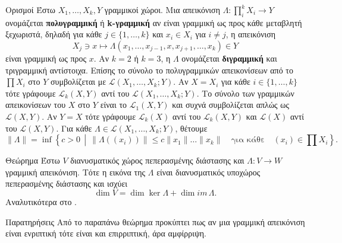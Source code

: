 \begin{nameddefn}{Ορισμοί}
    Έστω $X_1,\ldots,X_k,Y$ γραμμικοί χώροι. Μια απεικόνιση $ \Lambda: 
    \prod_i^k X_i \rightarrow Y$ ονομάζεται \textbf{πολυγραμμική} ή \textbf
    {k-γραμμική} αν είναι γραμμική ως προς κάθε μεταβλητή ξεχωριστά, δηλαδή για 
    κάθε $j \in \{1, \ldots, k\}$ και $x_i \in X_i $ για $i \neq j$, η 
    απεικόνιση
    \begin{equation*}
        X_j \ni x \mapsto \Lambda\left(x_1, \ldots , x_{j-1}, x, x_{j+1}, 
        \dots, x_k\right) \in Y
    \end{equation*}
    είναι γραμμική ως προς $x$. Αν $k = 2$ ή $k = 3$, η $\Lambda$ ονομάζεται 
    \textbf{διγραμμική} και τριγραμμική αντίστοιχα. Επίσης το σύνολο το 
    πολυγραμμικών απεικονίσεων από το $\prod X_i$ στο $Y$ συμβολίζεται με 
    $\mathcal{L}\left(X_1,\ldots,X_k; Y\right)$. Αν $X = X_i$ για κάθε $i \in 
    \{1,\ldots,k\}$ τότε γράφουμε $\mathcal{L}_k(X, Y)$ αντί του $\mathcal{L}
    \left(X_1,\ldots,X_k;Y\right)$. Το σύνολο των γραμμικών απεικονίσεων του $X$
    στο $Y$ είναι το $\mathcal{L}_1(X, Y)$ και συχνά συμβολίζεται απλώς ως 
    $\mathcal{L}(X, Y)$. Αν $Y = X$ τότε γράφουμε $\mathcal{L}_k(X)$ αντί του 
    $\mathcal{L}_k(X, Y)$ και $\mathcal{L}(X)$ αντί του $\mathcal{L}(X, Y)$. 
    Για κάθε $\Lambda \in \mathcal{L}\left(X_1, \ldots, X_k; Y\right)$, θέτουμε
    \begin{equation*}
        \|\Lambda\| = \inf \left\{c > 0 \,\middle|\, \|\Lambda\left((x_i)
        \right)\| \leq c\|x_1\|\ldots\|x_k\| \quad \text{για κάθε}\quad (x_i) 
        \in \prod X_i \right\}.
    \end{equation*}
\end{nameddefn}
\begin{namedthrm}{Θεώρημα} Έστω $V$ διανυσματικός χώρος πεπερασμένης διάστασης 
    και $\Lambda : V \rightarrow W$ γραμμική απεικόνιση. Τότε η εικόνα της 
    $\Lambda$ είναι διανυσματικός υποχώρος πεπερασμένης διάστασης και ισχύει 
    \begin{equation*}
        \dim{V} = \dim{\ker \Lambda} + \dim{im\, \Lambda}.
    \end{equation*}
    Αναλυτικότερα στο \cite{lax_07:linear}.
    \label{nlt_trm}
\end{namedthrm}
\begin{nameddefn*}{Παρατηρήσεις}
    Από το παραπάνω θεώρημα προκύπτει πως αν μια γραμμική απεικόνιση είναι 
    ενριπτική τότε είναι και επιρριπτική, άρα αμφίρριψη.
\end{nameddefn*}
